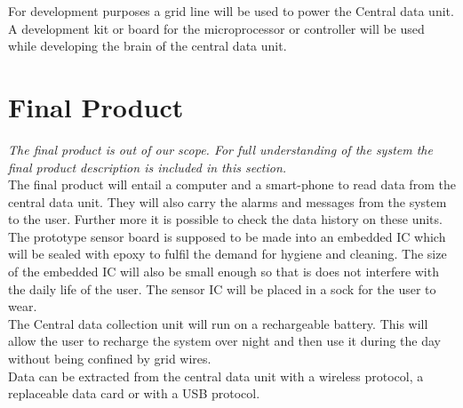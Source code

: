 For development purposes a grid line will be used to power the Central data unit. A development kit or board for the microprocessor or controller  will be used while developing the brain of the central data unit. \\

\section{Final Product}
\textit{The final product is out of our scope. For full understanding of the system the final product description is included in this section.}\\

The final product will entail a computer and a smart-phone to read data from the central data unit. They will also carry the alarms and messages from the system to the user. Further more it is possible to check the data history on these units. \\

The prototype sensor board is supposed to be made into an embedded IC which will be sealed with epoxy to fulfil the demand for hygiene and cleaning. The size of the embedded IC will also be small enough so that is does not interfere with the daily life of the user. The sensor IC will be placed in a sock for the user to wear. \\

The Central data collection unit will run on a rechargeable battery. This will allow the user to recharge the system over night and then use it during the day without being confined by grid wires.\\

Data can be extracted from the central data unit with a wireless protocol, a replaceable data card or with a USB protocol.